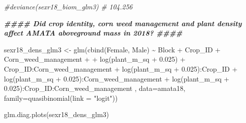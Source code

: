 \documentclass[
]{article}
\newenvironment{Shaded}{\begin{snugshade}}{\end{snugshade}}
\newcommand{\AttributeTok}[1]{\textcolor[rgb]{0.77,0.63,0.00}{#1}}
\newcommand{\CommentTok}[1]{\textcolor[rgb]{0.56,0.35,0.01}{\textit{#1}}}
\newcommand{\DocumentationTok}[1]{\textcolor[rgb]{0.56,0.35,0.01}{\textbf{\textit{#1}}}}
\newcommand{\FloatTok}[1]{\textcolor[rgb]{0.00,0.00,0.81}{#1}}
\newcommand{\FunctionTok}[1]{\textcolor[rgb]{0.00,0.00,0.00}{#1}}
\newcommand{\NormalTok}[1]{#1}
\newcommand{\OtherTok}[1]{\textcolor[rgb]{0.56,0.35,0.01}{#1}}
\newcommand{\SpecialCharTok}[1]{\textcolor[rgb]{0.00,0.00,0.00}{#1}}
\newcommand{\StringTok}[1]{\textcolor[rgb]{0.31,0.60,0.02}{#1}}
\begin{document}
\begin{Shaded}
\begin{Highlighting}[]
\CommentTok{\#deviance(sexr18\_biom\_glm3) \# 104.256}
\end{Highlighting}
\end{Shaded}

\begin{Shaded}
\begin{Highlighting}[]
\DocumentationTok{\#\#\#\# Did crop identity, corn weed management and plant density affect AMATA aboveground mass in 2018? \#\#\#\#}

\NormalTok{sexr18\_dens\_glm3 }\OtherTok{\textless{}{-}} \FunctionTok{glm}\NormalTok{(}\FunctionTok{cbind}\NormalTok{(Female, Male) }\SpecialCharTok{\textasciitilde{}}\NormalTok{ Block  }\SpecialCharTok{+}\NormalTok{ Crop\_ID }\SpecialCharTok{+}\NormalTok{ Corn\_weed\_management }\SpecialCharTok{+}
                          \SpecialCharTok{+} \FunctionTok{log}\NormalTok{(plant\_m\_sq }\SpecialCharTok{+} \FloatTok{0.025}\NormalTok{)  }\SpecialCharTok{+}
\NormalTok{                        Crop\_ID}\SpecialCharTok{:}\NormalTok{Corn\_weed\_management }\SpecialCharTok{+} 
                        \FunctionTok{log}\NormalTok{(plant\_m\_sq }\SpecialCharTok{+} \FloatTok{0.025}\NormalTok{)}\SpecialCharTok{:}\NormalTok{Crop\_ID }\SpecialCharTok{+}
                        \FunctionTok{log}\NormalTok{(plant\_m\_sq }\SpecialCharTok{+} \FloatTok{0.025}\NormalTok{)}\SpecialCharTok{:}\NormalTok{Corn\_weed\_management }\SpecialCharTok{+}
                        \FunctionTok{log}\NormalTok{(plant\_m\_sq }\SpecialCharTok{+} \FloatTok{0.025}\NormalTok{)}\SpecialCharTok{:}\NormalTok{Crop\_ID}\SpecialCharTok{:}\NormalTok{Corn\_weed\_management ,}
  \AttributeTok{data=}\NormalTok{amata18, }\AttributeTok{family=}\FunctionTok{quasibinomial}\NormalTok{(}\AttributeTok{link =} \StringTok{"logit"}\NormalTok{))}

\FunctionTok{glm.diag.plots}\NormalTok{(sexr18\_dens\_glm3)}
\end{Highlighting}
\end{Shaded}
\end{document}
